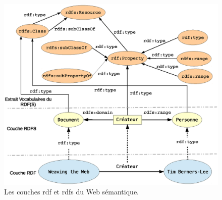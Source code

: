\begin{figure}[h]
    \centering
    \includegraphics[width=1.05\textwidth]{figs/A/rdfs-vs-rdf-layers.eps}
    \caption{Les couches \acrshort{rdf} et \acrshort{rdfs} du Web
      sémantique.}\label{fig:rdfs-vs-rdf-layers}
\end{figure}
